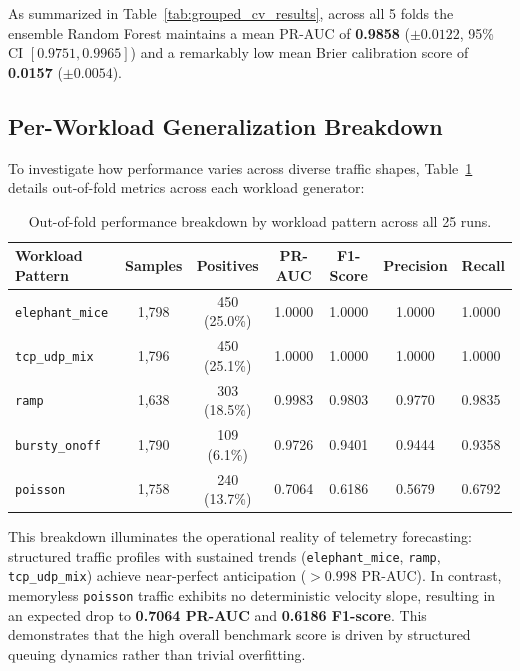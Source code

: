As summarized in Table~\ref{tab:grouped_cv_results}, across all 5 folds the ensemble Random Forest maintains a mean PR-AUC of \textbf{0.9858} ($\pm 0.0122$, 95\% CI $[0.9751, 0.9965]$) and a remarkably low mean Brier calibration score of \textbf{0.0157} ($\pm 0.0054$). 

\subsection{Per-Workload Generalization Breakdown}
To investigate how performance varies across diverse traffic shapes, Table~\ref{tab:workload_breakdown} details out-of-fold metrics across each workload generator:

\begin{table}[H]
  \centering
  \small
  \caption{Out-of-fold performance breakdown by workload pattern across all 25 runs.}
  \label{tab:workload_breakdown}
  \begin{tabularx}{\textwidth}{l c c c c c X}
    \toprule
    \textbf{Workload Pattern} & \textbf{Samples} & \textbf{Positives} & \textbf{PR-AUC} & \textbf{F1-Score} & \textbf{Precision} & \textbf{Recall} \\
    \midrule
    \texttt{elephant\_mice} & 1,798 & 450 (25.0\%) & 1.0000 & 1.0000 & 1.0000 & 1.0000 \\
    \texttt{tcp\_udp\_mix} & 1,796 & 450 (25.1\%) & 1.0000 & 1.0000 & 1.0000 & 1.0000 \\
    \texttt{ramp} & 1,638 & 303 (18.5\%) & 0.9983 & 0.9803 & 0.9770 & 0.9835 \\
    \texttt{bursty\_onoff} & 1,790 & 109 (6.1\%) & 0.9726 & 0.9401 & 0.9444 & 0.9358 \\
    \texttt{poisson} & 1,758 & 240 (13.7\%) & 0.7064 & 0.6186 & 0.5679 & 0.6792 \\
    \bottomrule
  \end{tabularx}
\end{table}

This breakdown illuminates the operational reality of telemetry forecasting: structured traffic profiles with sustained trends (\texttt{elephant\_mice}, \texttt{ramp}, \texttt{tcp\_udp\_mix}) achieve near-perfect anticipation ($>0.998$ PR-AUC). In contrast, memoryless \texttt{poisson} traffic exhibits no deterministic velocity slope, resulting in an expected drop to \textbf{0.7064 PR-AUC} and \textbf{0.6186 F1-score}. This demonstrates that the high overall benchmark score is driven by structured queuing dynamics rather than trivial overfitting.

